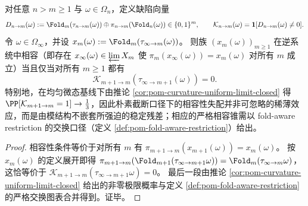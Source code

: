 \begin{proposition}\label{prop:pom-identity-cone-requires-curvature-reduction}
对任意 \(n>m\ge 1\) 与 \(\omega\in\Omega_n\)，定义缺陷向量
\[
D_{n\to m}(\omega):=\Fold_m(\tau_{n\to m}(\omega))\oplus \pi_{n\to m}(\Fold_n(\omega))\in\{0,1\}^m,
\qquad
\mathcal K_{n\to m}(\omega)=\mathbf 1[D_{n\to m}(\omega)\neq 0].
\]
令 \(\omega\in\Omega_\infty\)，并设 \(x_m(\omega):=\Fold_m(\tau_{\infty\to m}(\omega))\)。
则族 \((x_m(\omega))_{m\ge 1}\) 在逆系统中相容（即存在 \(x_\infty(\omega)\in\varprojlim X_m\) 使 \(\pi_m(x_\infty(\omega))=x_m(\omega)\) 对所有 \(m\) 成立）当且仅当对所有 \(m\ge 1\) 都有
\[
\mathcal K_{m+1\to m}(\tau_{\infty\to m+1}(\omega))=0.
\]
特别地，在均匀微态基线下由推论 \ref{cor:pom-curvature-uniform-limit-closed} 得 \(\PP[\mathcal K_{m+1\to m}=1]\to\tfrac13\)，因此朴素截断口径下的相容性失配并非可忽略的稀薄效应，而是由模结构不嵌套所强迫的稳定残差；相应的严格相容锥需以 fold-aware restriction 的交换口径（定义 \ref{def:pom-fold-aware-restriction}）给出。
\end{proposition}
\begin{proof}
相容性条件等价于对所有 \(m\) 有 \(\pi_{m+1\to m}(x_{m+1}(\omega))=x_m(\omega)\)。
按 \(x_m(\omega)\) 的定义展开即得
\(
\pi_{m+1\to m}(\Fold_{m+1}(\tau_{\infty\to m+1}\omega))=\Fold_m(\tau_{\infty\to m}\omega)
\)，这恰等价于 \(\mathcal K_{m+1\to m}(\tau_{\infty\to m+1}\omega)=0\)。
最后一段由推论 \ref{cor:pom-curvature-uniform-limit-closed} 给出的非零极限概率与定义 \ref{def:pom-fold-aware-restriction} 的严格交换图表合并得到。证毕。
\end{proof}

